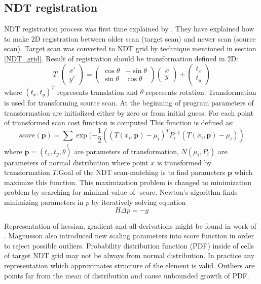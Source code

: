 \subsection{NDT registration}
\label{P2D_NDT}
NDT registration process was first time explained by \cite{Biber03}. They have explained how to make 2D registration between older scan (target scan) and newer scan (source scan). Target scan was converted to NDT grid by technique mentioned in section \ref{NDT_grid}. Result of registration should be transformation defined in 2D:
\begin{equation}
T: 
\begin{pmatrix}
x' \\ y'
\end{pmatrix}
=
\begin{pmatrix}
\cos \theta  & -\sin \theta\\
\sin \theta & \cos \theta
\end{pmatrix}
\begin{pmatrix}
x \\ y
\end{pmatrix}
+
\begin{pmatrix}
t_{x} \\ t_{y} 
\end{pmatrix}
\end{equation}
where $ (t_{x},t_{y})^{T}$ represents translation and $\theta$ represents rotation. Transformation is used for transforming source scan. At the beginning of program parameters of transformation are initialized either by zero or from initial guess. For each point of transformed scan cost function is computed This function is defined as:
\begin{equation}
score(\textbf{p}) = \sum_{i}^{} \exp(-\frac{1}{2} ((T(x_{i},\textbf{p})- \mu_{i})^{T} P^{-1}_{i}   (T(x_{i},\textbf{p})- \mu_{i}) ) 
\end{equation}
where $\textbf{p} = (t_{x},t_{y}, \theta)$ are parameters of transformation, $N(\mu_{i},P_{i})$ are parameters of normal distribution where point $x$ is transformed by transformation $T$.Goal of the NDT scan-matching is to find parameters $\textbf{p}$ which maximize this function. This maximization problem is changed to minimization problem by searching for minimal value of -score. Newton's algorithm finds minimizing parameters in $p$ by iteratively solving equation 
\begin{equation}
 H \varDelta p = -g
\end{equation}  

Representation of hessian, gradient and all derivations might be found in work of \cite{magnusson09}. Magnusson also introduced new scaling parameters into score function in order to reject possible outliers. Probability distribution function (PDF) inside of cells of target NDT grid may not be always from normal distribution. In practice any representation which approximates structure of the element is valid. Outliers are points far from the mean of distribution and cause unbounded growth of PDF.


